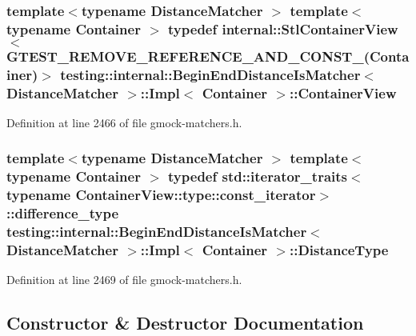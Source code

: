 \subsubsection[{\texorpdfstring{Container\+View}{ContainerView}}]{\setlength{\rightskip}{0pt plus 5cm}template$<$typename Distance\+Matcher $>$ template$<$typename Container $>$ typedef {\bf internal\+::\+Stl\+Container\+View}$<$ {\bf G\+T\+E\+S\+T\+\_\+\+R\+E\+M\+O\+V\+E\+\_\+\+R\+E\+F\+E\+R\+E\+N\+C\+E\+\_\+\+A\+N\+D\+\_\+\+C\+O\+N\+S\+T\+\_\+}(Container)$>$ {\bf testing\+::internal\+::\+Begin\+End\+Distance\+Is\+Matcher}$<$ Distance\+Matcher $>$\+::{\bf Impl}$<$ Container $>$\+::{\bf Container\+View}}\hypertarget{classtesting_1_1internal_1_1_begin_end_distance_is_matcher_1_1_impl_a5c76ede38c6143430f56e02e9024f535}{}\label{classtesting_1_1internal_1_1_begin_end_distance_is_matcher_1_1_impl_a5c76ede38c6143430f56e02e9024f535}


Definition at line 2466 of file gmock-\/matchers.\+h.

\subsubsection[{\texorpdfstring{Distance\+Type}{DistanceType}}]{\setlength{\rightskip}{0pt plus 5cm}template$<$typename Distance\+Matcher $>$ template$<$typename Container $>$ typedef std\+::iterator\+\_\+traits$<$ typename Container\+View\+::type\+::const\+\_\+iterator$>$\+::difference\+\_\+type {\bf testing\+::internal\+::\+Begin\+End\+Distance\+Is\+Matcher}$<$ Distance\+Matcher $>$\+::{\bf Impl}$<$ Container $>$\+::{\bf Distance\+Type}}\hypertarget{classtesting_1_1internal_1_1_begin_end_distance_is_matcher_1_1_impl_a10d901c49e2793dae6bcce6fa1a4e9fe}{}\label{classtesting_1_1internal_1_1_begin_end_distance_is_matcher_1_1_impl_a10d901c49e2793dae6bcce6fa1a4e9fe}


Definition at line 2469 of file gmock-\/matchers.\+h.



\subsection{Constructor \& Destructor Documentation}
